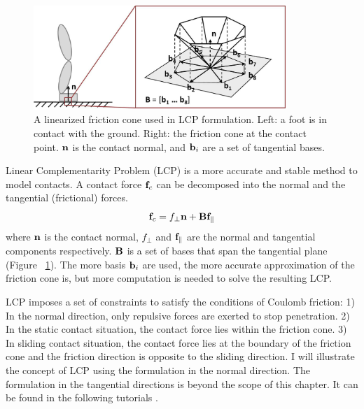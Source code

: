 \begin{figure}[h]
  \centering
  \includegraphics[width=0.85\textwidth]{figures/contact.jpg}
  \caption{A linearized friction cone used in LCP formulation. Left: a foot is in contact with the ground. Right: the friction cone at the contact point. $\mathbf{n}$ is the contact normal, and $\mathbf{b}_i$ are a set of tangential bases.}
  \label{fig:contactCone}
\end{figure}

Linear Complementarity Problem (LCP) is a more accurate and stable method to model contacts. A contact force $\mathbf{f}_c$ can be decomposed into the normal and the tangential (frictional) forces.
\begin{displaymath}
\mathbf{f}_c = f_\perp\mathbf{n}+\mathbf{B}\mathbf{f}_{\parallel}
\end{displaymath}
where $\mathbf{n}$ is the contact normal, $f_\perp$ and $\mathbf{f}_{\parallel}$ are the normal and tangential components respectively. $\mathbf{B}$ is a set of bases that span the tangential plane (Figure ~\ref{fig:contactCone}). The more basis $\mathbf{b}_i$ are used, the more accurate approximation of the friction cone is, but more computation is needed to solve the resulting LCP. 

LCP imposes a set of constraints to satisfy the conditions of Coulomb friction: 1) In the normal direction, only repulsive forces are exerted to stop penetration. 2) In the static contact situation, the contact force lies within the friction cone. 3) In sliding contact situation, the contact force lies at the boundary of the friction cone and the friction direction is opposite to the sliding direction. I will illustrate the concept of LCP using the formulation in the normal direction. The formulation in the tangential directions is beyond the scope of this chapter. It can be found in the following tutorials \cite{Lloyd:2005,Tan:2012b}. 

